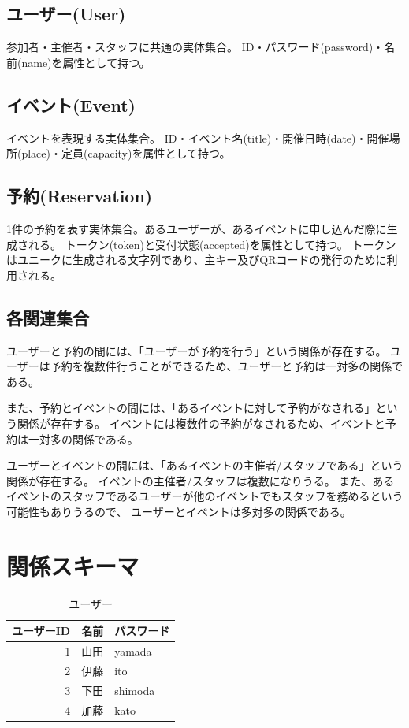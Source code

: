 \documentclass[dvipdfmx]{jarticle}
\begin{document}
\subsection{ユーザー(User)}
参加者・主催者・スタッフに共通の実体集合。
ID・パスワード(password)・名前(name)を属性として持つ。

\subsection{イベント(Event)}
イベントを表現する実体集合。
ID・イベント名(title)・開催日時(date)・開催場所(place)・定員(capacity)を属性として持つ。

\subsection{予約(Reservation)}
1件の予約を表す実体集合。あるユーザーが、あるイベントに申し込んだ際に生成される。
トークン(token)と受付状態(accepted)を属性として持つ。
トークンはユニークに生成される文字列であり、主キー及びQRコードの発行のために利用される。

\subsection{各関連集合}
ユーザーと予約の間には、「ユーザーが予約を行う」という関係が存在する。
ユーザーは予約を複数件行うことができるため、ユーザーと予約は一対多の関係である。

また、予約とイベントの間には、「あるイベントに対して予約がなされる」という関係が存在する。
イベントには複数件の予約がなされるため、イベントと予約は一対多の関係である。

ユーザーとイベントの間には、「あるイベントの主催者/スタッフである」という関係が存在する。
イベントの主催者/スタッフは複数になりうる。
また、あるイベントのスタッフであるユーザーが他のイベントでもスタッフを務めるという可能性もありうるので、
ユーザーとイベントは多対多の関係である。


\section{関係スキーマ}

\begin{table}[H]
  \centering
   \begin{tabular}{|r|l|l|}
    \hline
    ユーザーID & 名前 & パスワード \\
    \hline \hline
    1 & 山田 & yamada \\
    2 & 伊藤 & ito \\
    3 & 下田 & shimoda \\
    4 & 加藤 & kato \\
    \hline
  \end{tabular}
  \caption{ユーザー}
\end{table}
\end{document}
